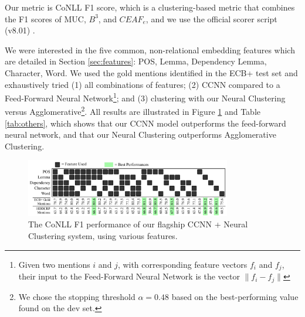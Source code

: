 \documentclass[11pt,a4paper]{article}
\begin{document}
Our metric is CoNLL F1 score, which is a clustering-based metric that combines the F1 scores of MUC, $B^{3}$, and $CEAF_{e}$, and we use the official scorer script (v8.01) \cite{Pradhan+etal:14a}.

We were interested in the five common, non-relational embedding features which are detailed in Section \ref{sec:features}: POS, Lemma, Dependency Lemma, Character, Word.  We used the gold mentions identified in the ECB+ test set and exhaustively tried (1) all combinations of features; (2) CCNN compared to a Feed-Forward Neural Network\footnote{Given two mentions $i$ and $j$, with corresponding feature vectors $f_i$ and $f_j$, their input to the Feed-Forward Neural Network is the vector $\|f_{i} - f_{j}\|$}; and (3) clustering with our Neural Clustering versus Agglomerative\footnote{We chose the stopping threshold $\alpha=0.48$ based on the best-performing value found on the dev set.}.  All results are illustrated in Figure \ref{fig:allfeatures} and Table \ref{tab:others}, which shows that our CCNN model outperforms the feed-forward neural network, and that our Neural Clustering outperforms Agglomerative Clustering.

\begin{figure}[h]
\centering
	\includegraphics[width=0.80\textwidth]{features.pdf}
	\caption{The CoNLL F1 performance of our flagship CCNN + Neural Clustering system, using various features.}
	\label{fig:allfeatures}
\end{figure}
\end{document}
